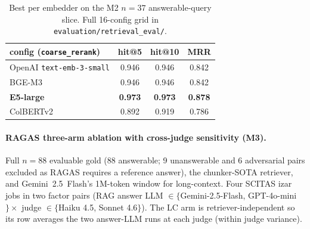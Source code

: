 \documentclass[11pt]{article}
\begin{document}
\begin{table}[h]
\centering
\footnotesize
\begin{tabular}{lccc}
\toprule
config (\texttt{coarse\_rerank}) & hit@5 & hit@10 & MRR \\
\midrule
OpenAI \texttt{text-emb-3-small}     & 0.946          & 0.946          & 0.842 \\
BGE-M3                                & 0.946          & 0.946          & 0.842 \\
\textbf{E5-large}                     & \textbf{0.973} & \textbf{0.973} & \textbf{0.878} \\
ColBERTv2                             & 0.892          & 0.919          & 0.786 \\
\bottomrule
\end{tabular}
\caption{Best per embedder on the M2 $n{=}37$ answerable-query slice. Full 16-config grid in \texttt{evaluation/retrieval\_eval/}.}
\label{tab:retrieval-app}
\end{table}

\paragraph{RAGAS three-arm ablation with cross-judge sensitivity (M3).} Full $n{=}88$ evaluable gold (88 answerable; 9 unanswerable and 6 adversarial pairs excluded as RAGAS requires a reference answer), the chunker-SOTA retriever, and Gemini~2.5~Flash's 1M-token window for long-context. Four SCITAS izar jobs in two factor pairs (RAG answer LLM $\in \{$Gemini-2.5-Flash, GPT-4o-mini$\} \times$ judge $\in \{$Haiku 4.5, Sonnet 4.6$\}$). The LC arm is retriever-independent so its row averages the two answer-LLM runs at each judge (within judge variance).
\end{document}
